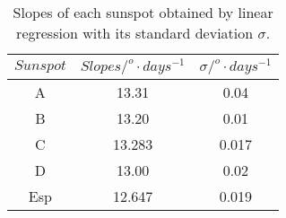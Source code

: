 \begin{table}[H]
	\centering
	\begin{tabular}{ c c c}
		\hline
		\centering
			$Sunspot$ & $Slopes/^o \cdot days^{-1}$ & $\sigma/^o \cdot days^{-1}$ \\\hline
			A & 13.31 & 0.04 \\
			B & 13.20 & 0.01 \\
			C & 13.283 & 0.017 \\
			D & 13.00 & 0.02 \\
			Esp & 12.647 & 0.019 \\\hline
	\end{tabular}
	\caption{\label{Tab:Slopes}Slopes of each sunspot obtained by linear regression with its standard deviation $\sigma$.}
\end{table}
